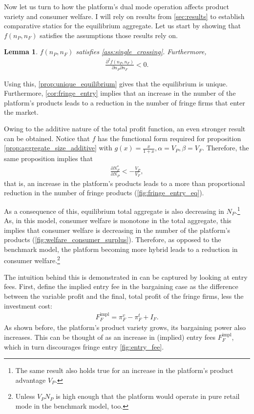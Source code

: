 \documentclass[a4paper]{article}
\newtheorem{lemma}{Lemma}
\begin{document}
Now let us turn to how the platform's dual mode operation affects product variety and consumer welfare.
I will rely on results from \cref{sec:results} to establish comparative statics for the equilibrium aggregate.
Let us start by showing that $f(n_P, n_F)$ satisfies the assumptions those results rely on.
\begin{lemma}
    \label{lem:profit_assumptions}
    $f(n_P, n_F)$ satisfies \cref{ass:single_crossing}.
    Furthermore,
    \begin{align*}
        \frac{\partial^2 f(n_P, n_F)}{\partial n_P \partial n_F} < 0.
    \end{align*}
\end{lemma}
Using this, \cref{prop:unique_equilibrium} gives that the equilibrium is unique.
Furthermore, \cref{cor:fringe_entry} implies that an increase in the number of the platform's products leads to a reduction in the number of fringe firms that enter the market.

Owing to the additive nature of the total profit function, an even stronger result can be obtained.
Notice that $f$ has the functional form required for proposition \ref{prop:aggregate_size_additive} with $g(x) = \frac{x}{1+x}, \alpha = V_P, \beta = V_F$.
Therefore, the same proposition implies that
\begin{align*}
    \frac{\partial N_F^*}{\partial N_P} < -\frac{V_P}{V_F},
\end{align*}
that is, an increase in the platform's products leads to a more than proportional reduction in the number of fringe products (\cref{fig:fringe_entry_eq}).

As a consequence of this, equilibrium total aggregate is also decreasing in $N_P$.\footnote{
    The same result also holds true for an increase in the platform's product advantage $V_P$.
}
As, in this model, consumer welfare is monotone in the total aggregate, this implies that consumer welfare is decreasing in the number of the platform's products (\cref{fig:welfare_consumer_surplus}).
Therefore, as opposed to the benchmark model, the platform becoming more hybrid leads to a reduction in consumer welfare.\footnote{
    Unless $V_P N_P$ is high enough that the platform would operate in pure retail mode in the benchmark model, too.
}

The intuition behind this is demonstrated in can be captured by looking at entry fees.
First, define the implied entry fee in the bargaining case as the difference between the variable profit and the final, total profit of the fringe firms, less the investment cost:
\begin{align*}
    F_F^{\text{impl}} = \pi_F^v - \pi_F^t + I_F.
\end{align*}
As shown before, the platform's product variety grows, its bargaining power also increases.
This can be thought of as an increase in (implied) entry fees $F_F^{\text{impl}}$, which in turn discourages fringe entry \cref{fig:entry_fee}.
\end{document}
